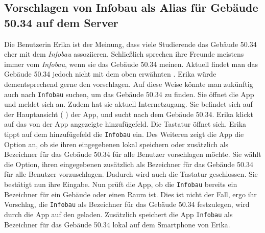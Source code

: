 \subsection{Vorschlagen von Infobau als Alias für Gebäude 50.34 auf dem Server}

Die Benutzerin Erika ist der Meinung, dass viele Studierende das Gebäude 50.34 eher mit dem %
\textit{Infobau} assoziieren.
Schließlich sprechen ihre Freunde meistens immer vom \textit{Infobau}, wenn sie das Gebäude 50.34 meinen.
Aktuell findet man das Gebäude 50.34 jedoch nicht mit dem oben erwähnten %
.
Erika würde dementsprechend gerne den %
vorschlagen.
Auf diese Weise könnte man zukünftig auch nach \texttt{Infobau} suchen, um das Gebäude 50.34 zu finden.
Sie öffnet die App und meldet sich an.
Zudem hat sie aktuell Internetzugang.
Sie befindet sich auf der Hauptansicht (%
) der App, und sucht nach dem Gebäude 50.34.
Erika klickt auf das von der App angezeigte %
hinzufügefeld. 
Die Tastatur öffnet sich.
Erika tippt auf dem %
hinzufügefeld die %
\texttt{Infobau} ein.
Des Weiteren zeigt die App die Option an, ob sie ihren eingegebenen %
lokal speichern oder zusätzlich als Bezeichner für das Gebäude 50.34 für alle Benutzer vorschlagen möchte.
Sie wählt die Option, ihren eingegebenen %
zusätzlich als Bezeichner für das Gebäude 50.34 für alle Benutzer vorzuschlagen. 
Dadurch wird auch die Tastatur geschlossen. 
Sie bestätigt nun ihre Eingabe. 
Nun prüft die App, ob die %
\texttt{Infobau} bereits ein Bezeichner für ein Gebäude oder einen Raum ist. 
Dies ist nicht der Fall, ergo ihr Vorschlag, die %
\texttt{Infobau} als Bezeichner für das Gebäude 50.34 festzulegen, wird durch die App auf den %
geladen. 
Zusätzlich speichert die App \texttt{Infobau} als Bezeichner für das Gebäude 50.34 lokal auf dem Smartphone von Erika.